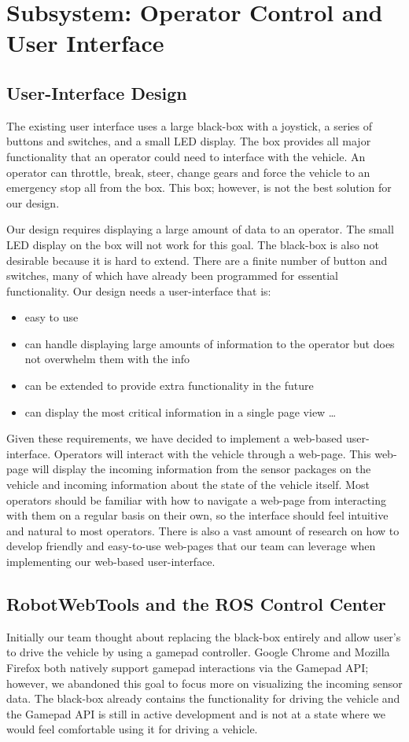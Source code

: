 \chapter{Subsystem: Operator Control and User Interface} \label{ch:ui}

\section{User-Interface Design} The existing user interface uses a large black-box with a joystick, a series of buttons and switches, and a small LED display.  The box provides all major functionality that an operator could need to interface with the vehicle.  An operator can throttle, break, steer, change gears and force the vehicle to an emergency stop all from the box.  This box; however, is not the best solution for our design.

Our design requires displaying a large amount of data to an operator.  The small LED display on the box will not work for this goal.  The black-box is also not desirable because it is hard to extend.  There are a finite number of button and switches, many of which have already been programmed for essential functionality.  Our design needs a user-interface that is:
\begin{itemize}
	\item easy to use
    \item can handle displaying large amounts of information to the operator but does not overwhelm them with the info
    \item can be extended to provide extra functionality in the future 
    \item can display the most critical information in a single page view
    \ldots
\end{itemize}
  
Given these requirements, we have decided to implement a web-based user-interface.  Operators will interact with the vehicle through a web-page.  This web-page will display the incoming information from the sensor packages on the vehicle and incoming information about the state of the vehicle itself.  Most operators should be familiar with how to navigate a web-page from interacting with them on a regular basis on their own, so the interface should feel intuitive and natural to most operators.  There is also a vast amount of research on how to develop friendly and easy-to-use web-pages that our team can leverage when implementing our web-based user-interface.

\section{RobotWebTools and the ROS Control Center}Initially our team thought about replacing the black-box entirely and allow user's to drive the vehicle by using a gamepad controller.  Google Chrome and Mozilla Firefox both natively support gamepad interactions via the Gamepad API; however, we abandoned this goal to focus more on visualizing the incoming sensor data.  The black-box already contains the functionality for driving the vehicle and the Gamepad API is still in active development and is not at a state where we would feel comfortable using it for driving a vehicle.

